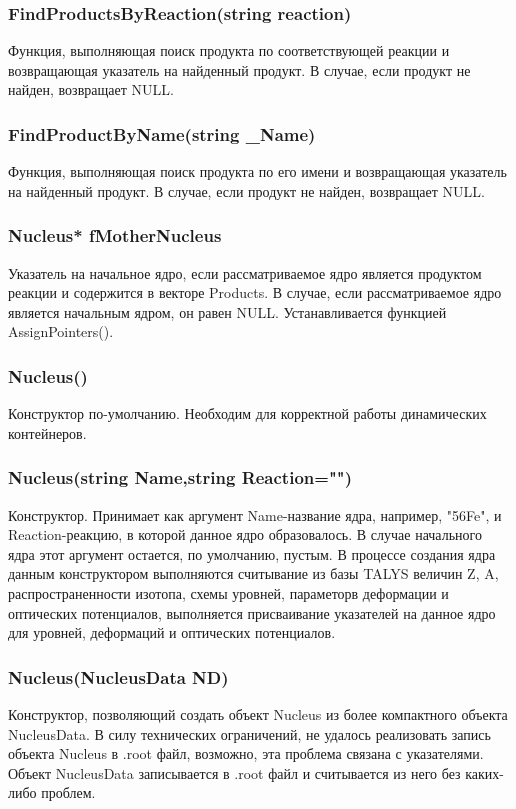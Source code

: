 \documentclass[a4paper,12pt]{extarticle}
\begin{document}
\subsubsection{FindProductsByReaction(string reaction)}
Функция, выполняющая поиск продукта по соответствующей реакции и возвращающая указатель на найденный продукт. В случае, если продукт не найден, возвращает NULL.
\subsubsection{FindProductByName(string _Name)}
Функция, выполняющая поиск продукта по его имени и возвращающая указатель на найденный продукт. В случае, если продукт не найден, возвращает NULL.
\subsubsection{Nucleus* fMotherNucleus}
Указатель на начальное ядро, если рассматриваемое ядро является продуктом реакции и содержится в векторе Products. В случае, если рассматриваемое ядро является начальным ядром, он равен NULL. Устанавливается функцией AssignPointers().
\subsubsection{Nucleus()}
Конструктор по-умолчанию. Необходим для корректной работы динамических контейнеров.
\subsubsection{Nucleus(string Name,string Reaction=\textbf{""})}
Конструктор. Принимает как аргумент Name-название ядра, например, "56Fe",  и Reaction-реакцию, в которой данное ядро образовалось. В случае начального ядра этот аргумент остается, по умолчанию, пустым. В процессе создания ядра данным конструктором выполняются считывание из базы TALYS величин Z, A, распространенности изотопа, схемы уровней, параметорв деформации и оптических потенциалов, выполняется присваивание указателей на данное ядро для уровней, деформаций и оптических потенциалов.
\subsubsection{Nucleus(NucleusData ND)}
Конструктор, позволяющий создать объект Nucleus из более компактного объекта NucleusData. В силу технических ограничений, не удалось реализовать запись объекта Nucleus в .root файл, возможно, эта проблема связана с указателями. Объект NucleusData записывается в .root файл и считывается из него без каких-либо проблем.
\end{document}
